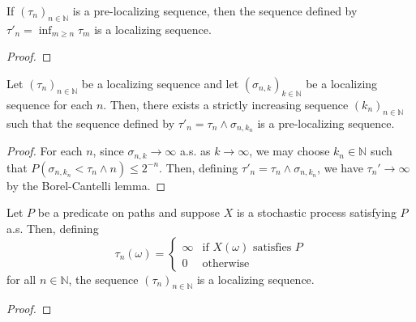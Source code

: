 \begin{lemma}\label{lem:isLocalizingSequence_of_isPreLocalizingSequence}
  \leanok
If $(\tau_n)_{n \in \mathbb{N}}$ is a pre-localizing sequence, then the sequence defined by $\tau'_n = \inf_{m \ge n} \tau_m$ is a localizing sequence.
\end{lemma}

\begin{proof}\leanok

\end{proof}


\begin{lemma}\label{lem:isPreLocalizingSequence_of_isLocalizingSequence}
  \leanok
Let $(\tau_n)_{n \in \mathbb{N}}$ be a localizing sequence and let $(\sigma_{n,k})_{k \in \mathbb{N}}$ be a localizing sequence for each $n$.
Then, there exists a strictly increasing sequence $(k_n)_{n \in \mathbb{N}}$ such that the sequence defined by $\tau'_n = \tau_n \wedge \sigma_{n,k_n}$ is a pre-localizing sequence.
\end{lemma}

\begin{proof}\leanok
  For each $n$, since $\sigma_{n,k} \to \infty$ a.s. as $k \to \infty$, we may choose $k_n \in \mathbb{N}$ such that $P(\sigma_{n,k_n} < \tau_n \wedge n) \le 2^{-n}$.
  Then, defining $\tau'_n = \tau_n \wedge \sigma_{n,k_n}$, we have $\tau_n' \to \infty$ by the Borel-Cantelli lemma.
\end{proof}


\begin{lemma}\label{lem:isLocalizingSequence_ae}
  \leanok
  Let $P$ be a predicate on paths and suppose $X$ is a stochastic process satisfying $P$ a.s. Then, defining
  $$\tau_n(\omega) =
  \begin{cases}
    \infty & \text{if } X(\omega) \text{ satisfies } P \\
    0 & \text{otherwise}
  \end{cases}
  $$
  for all $n \in \mathbb{N}$, the sequence $(\tau_n)_{n \in \mathbb{N}}$ is a localizing sequence.
\end{lemma}

\begin{proof}\leanok
\end{proof}


